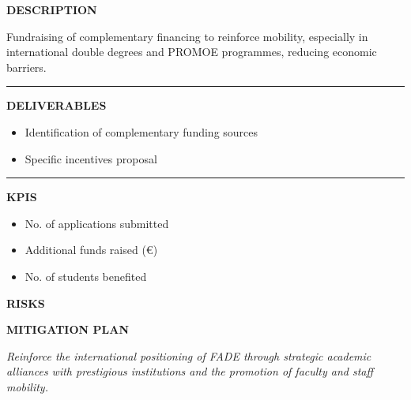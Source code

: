\documentclass[11pt,a4paper]{scrreprt}
\newcommand{\fieldlabel}[1]{%
  {\footnotesize\sffamily\bfseries\color{mutedcolor}\MakeUppercase{#1}}\par\nopagebreak[4]
}
\newcommand{\fieldsep}{\vspace{3pt}\noindent\textcolor{bordercolor}{\rule{\linewidth}{0.4pt}}\vspace{3pt}\par}
\begin{document}
\begin{tcolorbox}[pabox={fgcolor}{A.P.4.2 \enspace\textbullet\enspace Mobility Incentives through Additional Fundraising}]

\fieldlabel{Description}
{\small Fundraising of complementary financing to reinforce mobility, especially in international double degrees and PROMOE programmes, reducing economic barriers.}\par
\fieldsep
\fieldlabel{Deliverables}
{\small \begin{itemize}[noitemsep,topsep=2pt]
\item Identification of complementary funding sources
\item Specific incentives proposal
\end{itemize}}\par
\fieldsep
\fieldlabel{KPIs}
{\small \begin{itemize}[noitemsep,topsep=2pt]
\item No. of applications submitted
\item Additional funds raised (€)
\item No. of students benefited
\end{itemize}}\par
\end{tcolorbox}
\begin{tcolorbox}[riskbox]
{\footnotesize\sffamily\bfseries\color{red!50!black} RISKS}\par{}
\end{tcolorbox}
\begin{tcolorbox}[mitbox]
{\footnotesize\sffamily\bfseries\color{green!40!black} MITIGATION PLAN}\par{}
\end{tcolorbox}
\vspace{8pt}

\newpage
{}
{\small\color{mutedcolor}\itshape Reinforce the international positioning of FADE through strategic academic alliances with prestigious institutions and the promotion of faculty and staff mobility.}\par\vspace{6pt}
\end{document}
